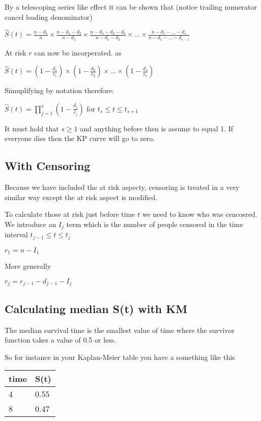 \documentclass[
  letterpaper,
  DIV=11,
  numbers=noendperiod]{scrreprt}
\begin{document}
By a telescoping series like effect it can be shown that (notice
trailing numerator cancel leading denominator)

\(\hat{S}(t) = \frac{n-d_1}{n} \times \frac{n-d_1 - d_2}{n - d_1} \times \frac{n-d_1 - d_2- d_3}{n - d_1 - d_2} \times ... \times \frac{n - d_1 - ... - d_s}{n - d_1 - ... - d_{s-1}}\)

At risk \(r\) can now be incorperated. as

\(\hat{S}(t) = (1 - \frac{d_1}{r_1}) \times (1 - \frac{d_2}{r_2}) \times ... \times (1 - \frac{d_s}{r_s})\)

Simuplifying by notation therefore:

\(\hat{S}(t) = \prod^s_{j=1}( 1 - \frac{d_j}{r_j})\) for
\(t_s\leq t \leq t_{s+1}\)

It must hold that \(s\geq 1\) and anything before then is assume to
equal 1. If everyone dies then the KP curve will go to zero.

\hypertarget{with-censoring}{%
\subsection{With Censoring}\label{with-censoring}}

Because we have included the at risk aspecty, censoring is treated in a
very similar way except the at risk aspect is modified.

To calculate those at risk just before time \(t\) we need to know who
was cencosred. We introduce an \(I_j\) term which is the number of
people censored in the time interval \(t_{j-1} \leq t \leq t_j\)

\(r_1 = n - I_1\)

More generally

\(r_j = r_{j-1} - d_{j-1} - I_j\)

\hypertarget{calculating-median-st-with-km}{%
\subsection{Calculating median S(t) with
KM}\label{calculating-median-st-with-km}}

The median survival time is the smallest value of time where the
survivor function takes a value of 0.5 or less.

So for instance in your Kaplan-Meier table you have a something like
this

\begin{longtable}[]{@{}ll@{}}
\toprule()
time & S(t) \\
\midrule()
\endhead
4 & 0.55 \\
8 & 0.47 \\
\bottomrule()
\end{longtable}
\end{document}
